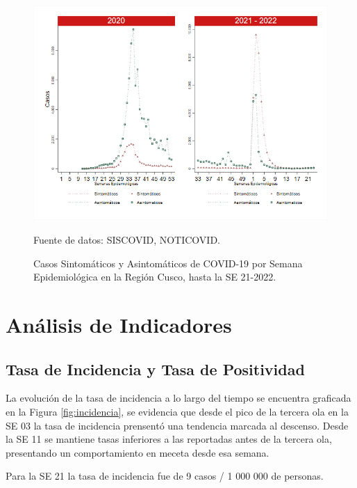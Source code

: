 \documentclass[12pt,a4paper,openany]{book}
\begin{document}
	\begin{figure}[h]
		\caption{Casos Sintomáticos y Asintomáticos de COVID-19 por Semana Epidemiológica en la Región Cusco, hasta la SE 21-2022.  }\label{fig:sintomaticos_asintomati}
		
		\begin{center}
			\includegraphics[width=0.75\linewidth]{../figuras/sintomaticos_20_21_22.png}
		\end{center}
		{\footnotesize {Fuente de datos: SISCOVID, NOTICOVID.}}
	\end{figure}
	\clearpage
	
	
	
	\clearpage
	
	\section*{Análisis de Indicadores}
	\subsection*{Tasa de Incidencia y Tasa de Positividad}
	\noindent La evolución de la tasa de incidencia a lo largo del tiempo se encuentra graficada en la Figura \ref{fig:incidencia}, se evidencia que desde el pico de la tercera ola en la SE 03 la tasa de incidencia prensentó una tendencia marcada al descenso.  Desde la SE 11 se mantiene tasas inferiores a las reportadas antes de la tercera ola, presentando un comportamiento en meceta desde esa semana. 
	
	Para la SE 21 la tasa de incidencia fue de 9 casos / 1 000 000 de personas. 
	
\end{document}
